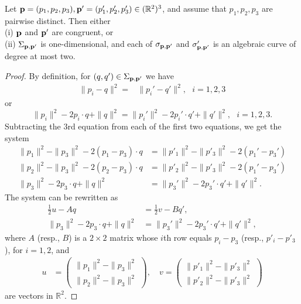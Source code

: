 \documentclass[10pt,a4paper]{amsart}
\newcommand{\RR}{\mathbb{R}}
\newcommand{\p}{{\bf p}}
\begin{document}
\begin{lem}\label{conic}
Let $\p=(p_1,p_2,p_3), \p'=(p_1',p_2',p_3')\in  (\RR^2)^3$, and assume that $p_1,p_2,p_3$ are pairwise distinct.
Then either\\
(i)  $\p$ and $\p'$ are congruent, or \\
(ii) $\Sigma_{\p,\p'}$ is one-dimensional, and each of $\sigma_{\p,\p'}$ and $\sigma'_{\p,\p'}$ is an algebraic curve of degree at most two.
\end{lem}

\begin{proof}
By definition, for $(q,q')\in \Sigma_{\p,\p'}$ we have
\begin{align*}
\|p_i-q\|^2=&\|p_i'-q'\|^2,~~~i=1,2,3
\end{align*}
or
$$
\|p_i\|^2-2p_i\cdot q+\|q\|^2=\|p_i'\|^2-2p_i'\cdot q'+\|q'\|^2,~~~i=1,2,3.
$$
Subtracting  the $3$rd equation from each of the first two equations, we get the system
\begin{align}
\|p_1\|^2-\|p_3\|^2-2(p_1-p_3)\cdot q&= \|p'_1\|^2-\|p'_3\|^2-2(p_1'-p_3')\nonumber\\
\|p_2\|^2-\|p_3\|^2-2(p_2-p_3)\cdot q&= \|p'_2\|^2-\|p'_3\|^2-2(p_1'-p_3')\label{sysK3n}\\
\|p_3\|^2-2p_3\cdot q+\|q\|^2&=\|p_3'\|^2-2p_3'\cdot q'+\|q'\|^2.\nonumber
\end{align}
The system can be rewritten as
\begin{align*}
\tfrac12u-A q&=\tfrac12 v-B q', \\
\|p_3\|^2-2p_3\cdot q+\|q\|^2&=\|p_3'\|^2-2p_3'\cdot q'+\|q'\|^2 ,
\end{align*}
where $A$ (resp., $B$) is a $2\times 2$ matrix whose $i$th row equals $p_i-p_3$ 
(resp., $p'_i-p'_3$), for $i=1,2$, and 
\begin{align*}
u & = \left(\begin{matrix}
           \|p_1\|^2-\|p_3\|^2 \\
          \|p_2\|^2-\|p_3\|^2 
         \end{matrix}
         \right) , \quad 
         v   = \left(\begin{matrix}
           \|p'_1\|^2-\|p'_3\|^2 \\
          \|p'_2\|^2-\|p'_3\|^2 
         \end{matrix}
         \right) 
\end{align*}
are vectors in $\RR^2$. 


\end{proof}
\end{document}
